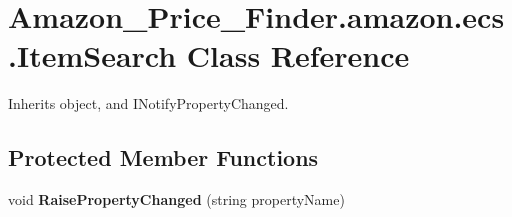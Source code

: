 \hypertarget{class_amazon___price___finder_1_1amazon_1_1ecs_1_1_item_search}{\section{Amazon\-\_\-\-Price\-\_\-\-Finder.\-amazon.\-ecs.\-Item\-Search Class Reference}
\label{class_amazon___price___finder_1_1amazon_1_1ecs_1_1_item_search}
}


 




Inherits object, and I\-Notify\-Property\-Changed.

\subsection*{Protected Member Functions}
\begin{DoxyCompactItemize}
\item 
\hypertarget{class_amazon___price___finder_1_1amazon_1_1ecs_1_1_item_search_a5f6944425f53b45364b59a478ae60aef}{void {\bfseries Raise\-Property\-Changed} (string property\-Name)}\label{class_amazon___price___finder_1_1amazon_1_1ecs_1_1_item_search_a5f6944425f53b45364b59a478ae60aef}

\end{DoxyCompactItemize}
